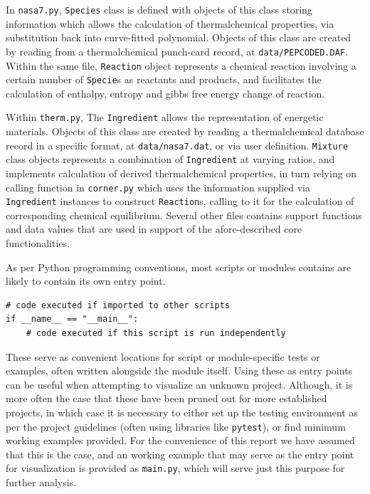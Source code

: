 \documentclass[conference]{IEEEtran}
\begin{document}
In \texttt{nasa7.py}, \texttt{Species} class is defined with objects of this class storing information which allows the calculation of thermalchemical properties, via substitution back into curve-fitted polynomial. Objects of this class are created by reading from a thermalchemical punch-card record, at \texttt{data/PEPCODED.DAF}. Within the same file, \texttt{Reaction} object represents a chemical reaction involving a certain number of \texttt{Specie}s as reactants and products, and facilitates the calculation of enthalpy, entropy and gibbs free energy change of reaction.\par

Within \texttt{therm.py}, The \texttt{Ingredient} allows the representation of energetic materials. Objects of this class are created by reading a thermalchemical database record in a specific format, at \texttt{data/nasa7.dat}, or via user definition. \texttt{Mixture} class objects represents a combination of \texttt{Ingredient} at varying ratios, and implements calculation of derived thermalchemical properties, in turn relying on calling function in \texttt{corner.py} which uses the information supplied via \texttt{Ingredient} instances to construct \texttt{Reaction}s, calling to it for the calculation of corresponding chemical equilibrium. Several other files contains support functions and data values that are used in support of the afore-described core functionalities.\par

As per Python programming conventions, most scripts or modules contains are likely to contain its own entry point.
\begin{lstlisting}[caption=Entry Point for Python Scripts]
# code executed if imported to other scripts
if __name__ == "__main__":
	# code executed if this script is run independently
\end{lstlisting}
These serve as convenient locations for script or module-specific tests or examples, often written alongside the module itself. Using these as entry points can be useful when attempting to visualize an unknown project. Although, it is more often the case that these have been pruned out for more established projects, in which case it is necessary to either set up the testing environment as per the project guidelines (often using libraries like \texttt{pytest}), or find minimum working examples provided. For the convenience of this report we have assumed that this is the case, and an working example that may serve as the entry point for visualization is provided as \texttt{main.py}, which will serve just this purpose for further analysis.\par
\end{document}
